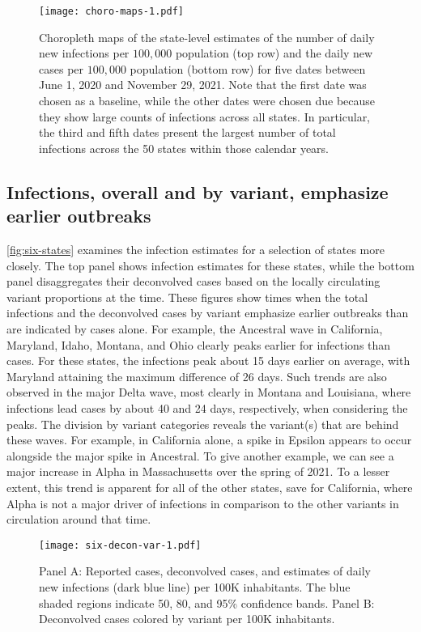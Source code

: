 \begin{figure}[!tb]
\centering
\texttt{[image: choro-maps-1.pdf]}
\caption{Choropleth maps of the state-level estimates of the number of daily new
infections per $100,000$ population (top row) and the daily new cases per
$100,000$ population (bottom row) for five dates between June 1, 2020 and
November 29, 2021. Note that the first date was chosen as a baseline, while the
other dates were chosen due because they show large counts of infections across all
states. In particular, the third and fifth dates present the largest number of
total infections across the 50 states within those calendar years.} 
\label{fig:choro_inf_case_rates}
\end{figure}    



    
\subsection{Infections, overall and by variant, emphasize earlier outbreaks}
\label{sec:infections-by-voc}

\autoref{fig:six-states} examines the infection estimates for a selection of
states more closely. The top panel shows infection estimates for these states,
while the bottom panel disaggregates their deconvolved cases based on the locally
circulating variant proportions at the time. These figures show times when the
total infections and the deconvolved cases by variant emphasize earlier
outbreaks than are indicated by cases alone. For example, the Ancestral
wave in California, Maryland, Idaho, Montana, and Ohio clearly peaks earlier for
infections than cases. For these states, the infections peak about 15 days
earlier on average, with Maryland attaining the maximum difference of 26 days.
Such trends are also observed in the 
major Delta wave, most clearly in Montana and Louisiana, 
where infections lead cases by about 40 and 24 days, respectively, 
when considering the peaks.
The division by variant categories reveals the variant(s) that are behind these waves. For
example, in California alone, a spike in Epsilon appears to occur 
alongside the major spike in Ancestral. To give another example, 
we can see a major increase in Alpha in Massachusetts over the spring
of 2021. To a lesser extent, this trend is apparent for all of the other states,
save for California, where Alpha is not a major driver of infections in
comparison to the other variants in circulation around that time. 

\begin{figure}[!tb]
\centering
    \texttt{[image: six-decon-var-1.pdf]}
    \caption{Panel A: Reported cases, deconvolved cases, and estimates of
    daily new infections (dark blue line) per 100K inhabitants. The blue shaded
    regions indicate 50, 80, and 95\% confidence bands.  
    Panel B: Deconvolved cases colored by variant per 100K inhabitants.}
    \label{fig:six-states}
\end{figure}


